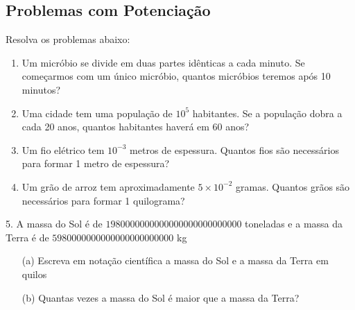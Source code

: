 \documentclass[a4paper,12pt]{article}
\begin{document}
\begin{multicols}{2}
		\section*{Problemas com Potenciação}
		Resolva os problemas abaixo:
		\begin{enumerate}
			\item Um micróbio se divide em duas partes idênticas a cada minuto. Se começarmos com um único micróbio, quantos micróbios teremos após 10 minutos?
			\item Uma cidade tem uma população de $10^5$ habitantes. Se a população dobra a cada 20 anos, quantos habitantes haverá em 60 anos?
			\item Um fio elétrico tem $10^{-3}$ metros de espessura. Quantos fios são necessários para formar 1 metro de espessura?
			\item Um grão de arroz tem aproximadamente $5 \times 10^{-2}$ gramas. Quantos grãos são necessários para formar 1 quilograma?
		\end{enumerate}		
	\end{multicols}

	\hfill
	 
	5. A massa do Sol é de $1 980 000 000 000 000 000 000 000 000$ toneladas e a massa da Terra é de $5 980 000 000 000 000 000 000 000$ kg
	\begin{enumerate}
		\item[(a)] Escreva em notação científica a massa do Sol e a massa da Terra em quilos
		\item[(b)] Quantas vezes a massa do Sol é maior que a massa da Terra?
	\end{enumerate}
	
\end{document}
